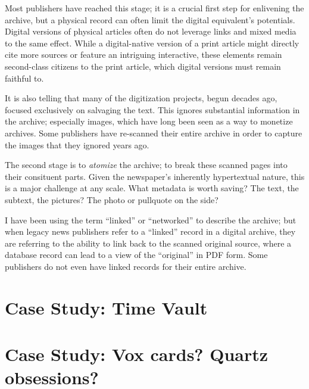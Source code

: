 Most publishers have reached this stage; it is a crucial first step for enlivening the archive, but a physical record can often limit the digital equivalent's potentials. Digital versions of physical articles often do not leverage links and mixed media to the same effect. While a digital-native version of a print article might directly cite more sources or feature an intriguing interactive, these elements remain second-class citizens to the print article, which digital versions must remain faithful to.

It is also telling that many of the digitization projects, begun decades ago, focused exclusively on salvaging the text. This ignores substantial information in the archive; especially images, which have long been seen as a way to monetize archives. %
Some publishers have re-scanned their entire archive in order to capture the images that they ignored years ago.  %

The second stage is to \emph{atomize} the archive; to break these scanned pages into their consituent parts. Given the newspaper's inherently hypertextual nature, this is a major challenge at any scale. What metadata is worth saving? The text, the subtext, the pictures? The photo or pullquote on the side?

I have been using the term ``linked'' or ``networked'' to describe the archive; but when legacy news publishers refer to a ``linked'' record in a digital archive, they are referring to the ability to link back to the scanned original source, where a database record can lead to a view of the ``original'' in PDF form. Some publishers do not even have linked records for their entire archive.


\section{Case Study: Time Vault}

\section{Case Study: Vox cards? Quartz obsessions?}